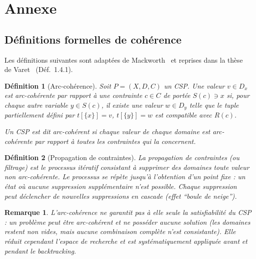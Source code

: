 \documentclass[11pt,a4paper]{article}
\newtheorem{definition}{Définition}
\newtheorem{remarque}{Remarque}
\begin{document}
\newpage
\appendix

\section{Annexe}

\subsection{Définitions formelles de cohérence}
\label{app:coherence}

Les définitions suivantes sont adaptées de Mackworth~\cite{mackworth1977}
et reprises dans la thèse de Varet~\cite{varet2022} (Déf.\ 1.4.1).

\begin{definition}[Arc-cohérence]
Soit $P = (X, D, C)$ un CSP. Une valeur $v \in D_x$ est
\emph{arc-cohérente} par rapport à une contrainte $c \in C$ de portée
$S(c) \ni x$ si, pour chaque autre variable $y \in S(c)$, il existe une
valeur $w \in D_y$ telle que le tuple partiellement défini par
$t[\{x\}] = v$, $t[\{y\}] = w$ est compatible avec $R(c)$.

Un CSP est dit \emph{arc-cohérent} si chaque valeur de chaque domaine
est arc-cohérente par rapport à toutes les contraintes qui la concernent.
\end{definition}

\begin{definition}[Propagation de contraintes]
La \emph{propagation de contraintes} (ou \emph{filtrage}) est le
processus itératif consistant à supprimer des domaines toute valeur non
arc-cohérente. Le processus se répète jusqu'à l'obtention d'un
\emph{point fixe} : un état où aucune suppression supplémentaire n'est
possible. Chaque suppression peut déclencher de nouvelles suppressions
en cascade (effet ``boule de neige'').
\end{definition}

\begin{remarque}
L'arc-cohérence ne garantit pas à elle seule la satisfiabilité du CSP :
un problème peut être arc-cohérent et ne posséder aucune solution (les
domaines restent non vides, mais aucune combinaison complète n'est
consistante). Elle réduit cependant l'espace de recherche et est
systématiquement appliquée avant et pendant le backtracking.
\end{remarque}
\end{document}
